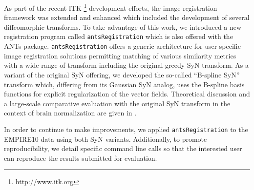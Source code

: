 \documentclass{llncs}
\begin{document}
As part of the recent ITK%
\footnote{
http://www.itk.org
}
development efforts, the image registration framework was extended and 
enhanced which included the development of several diffeomorphic transforms.
To take advantage of this work, we introduced a new registration program 
called {\tt antsRegistration} which is also offered with the ANTs package.  
{\tt antsRegistration} offers a generic architecture for user-specific 
image registration solutions permitting matching of various similarity metrics
with a wide range of transform including the original greedy SyN transform.
As a variant of the original SyN offering, we developed the so-called 
``B-spline SyN'' transform which, differing from its Gaussian SyN analog,
uses the B-spline basis functions for explicit regularization of the 
vector fields.  Theoretical discussion and a large-scale comparative evaluation
with the original SyN transform in the context of brain normalization are given 
in \cite{tustison2013}.  

In order to continue to make improvements, we applied {\tt antsRegistration} to
the EMPIRE10 data using both SyN variants.  Additionally, to promote reproducibility, 
we detail specific command line calls so that the interested user
can reproduce the results submitted for evaluation. 
\end{document}

